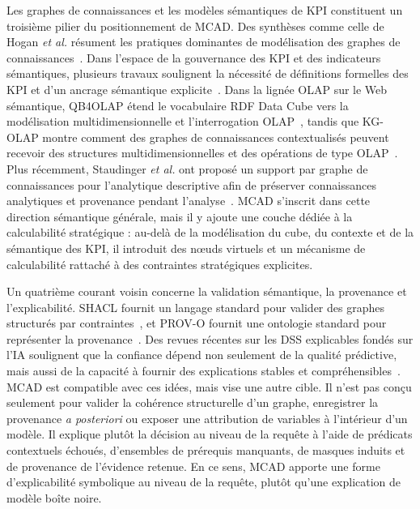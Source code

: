 \documentclass[journal]{IEEEtran}
\begin{document}
Les graphes de connaissances et les modèles sémantiques de KPI constituent un troisième pilier du positionnement de MCAD. Des synthèses comme celle de Hogan \emph{et al.} résument les pratiques dominantes de modélisation des graphes de connaissances~\cite{HoganKGSurvey2021}. Dans l'espace de la gouvernance des KPI et des indicateurs sémantiques, plusieurs travaux soulignent la nécessité de définitions formelles des KPI et d'un ancrage sémantique explicite~\cite{DiamantiniKPISurvey2025,Niedritis2011}. Dans la lignée OLAP sur le Web sémantique, QB4OLAP étend le vocabulaire RDF Data Cube vers la modélisation multidimensionnelle et l'interrogation OLAP~\cite{Etcheverry2014}, tandis que KG-OLAP montre comment des graphes de connaissances contextualisés peuvent recevoir des structures multidimensionnelles et des opérations de type OLAP~\cite{SchuetzSerafiniBozzato2021}. Plus récemment, Staudinger \emph{et al.} ont proposé un support par graphe de connaissances pour l'analytique descriptive afin de préserver connaissances analytiques et provenance pendant l'analyse~\cite{StaudingerSchuetzSchrefl2025}. MCAD s'inscrit dans cette direction sémantique générale, mais il y ajoute une couche dédiée à la calculabilité stratégique : au-delà de la modélisation du cube, du contexte et de la sémantique des KPI, il introduit des nœuds virtuels et un mécanisme de calculabilité rattaché à des contraintes stratégiques explicites.

Un quatrième courant voisin concerne la validation sémantique, la provenance et l'explicabilité. SHACL fournit un langage standard pour valider des graphes structurés par contraintes~\cite{W3CSHACL2017}, et PROV-O fournit une ontologie standard pour représenter la provenance~\cite{W3CPROVO2013}. Des revues récentes sur les DSS explicables fondés sur l'IA soulignent que la confiance dépend non seulement de la qualité prédictive, mais aussi de la capacité à fournir des explications stables et compréhensibles~\cite{KostopoulosXAIDSS2024}. MCAD est compatible avec ces idées, mais vise une autre cible. Il n'est pas conçu seulement pour valider la cohérence structurelle d'un graphe, enregistrer la provenance \emph{a posteriori} ou exposer une attribution de variables à l'intérieur d'un modèle. Il explique plutôt la décision au niveau de la requête à l'aide de prédicats contextuels échoués, d'ensembles de prérequis manquants, de masques induits et de provenance de l'évidence retenue. En ce sens, MCAD apporte une forme d'explicabilité symbolique au niveau de la requête, plutôt qu'une explication de modèle boîte noire.
\end{document}
